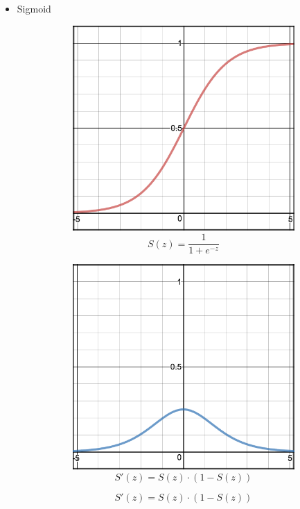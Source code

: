 \begin{itemize}
    \item Sigmoid
    \begin{figure}[H]
        \centering
        \begin{subfigure}{0.5\textwidth}
            \centering
            \includegraphics[width=0.9\linewidth]{fig/actfunc_sigmoid.png}
            \caption{%
                \begin{equation}
                    S(z) = \frac{1} {1 + e^{-z}}
                \end{equation}
            }
            \label{fig:actfunc_sigmoid}
        \end{subfigure}%
        \begin{subfigure}{0.5\textwidth}
            \centering
            \includegraphics[width=0.9\linewidth]{fig/actfunc_sigmoid_der.png}
            \caption{%
                \begin{equation}
                    S'(z) = S(z) \cdot (1 - S(z))
                \end{equation}
            }
            \label{fig:actfunc_sigmoid_der}
        \end{subfigure}
    \end{figure}
    

\end{itemize}
